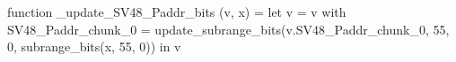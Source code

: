 function _update_SV48_Paddr_bits (v, x) = let v = { v with SV48_Paddr_chunk_0 = update_subrange_bits(v.SV48_Paddr_chunk_0, 55, 0, subrange_bits(x, 55, 0)) } in
  v

